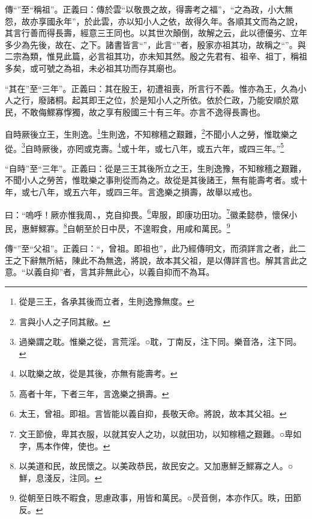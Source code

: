 {\noindent\zhuan{}\fzbyks 傳“”至“稱祖”。正義曰：傳於雲“以敬畏之故，得壽考之福”，“之為政，小大無怨，故亦享國永年”，於此雲，亦以知小人之依，故得久年。各順其文而為之說，其言行善而得長壽，經意三王同也。以其世次顛倒，故解之云，此以德優劣、立年多少為先後，故在、之下。諸書皆言“”，此言“”者，殷家亦祖其功，故稱之“”。與二宗為類，惟見此篇，必言祖其功，亦未知其然。殷之先君有、祖辛、祖丁，稱祖多矣，或可號之為祖，未必祖其功而存其廟也。 \par}

{\noindent\shu{}\fzkt “其在”至“三年”。正義曰：其在殷王，初遭祖喪，所言行不義。惟亦為王，久為小人之行，廢諸桐。起其即王之位，於是知小人之所依。依於仁政，乃能安順於眾民，不敢侮鰥寡惸獨，故之享有殷國三十有三年。亦言不逸得長壽也。 \par}

自時厥後立王，生則逸。\footnote{從是三王，各承其後而立者，生則逸豫無度。}生則逸，不知稼穡之艱難，\footnote{言與小人之子同其敝。}不聞小人之勞，惟耽樂之從。\footnote{過樂謂之耽。惟樂之從，言荒淫。○耽，丁南反，注下同。樂音洛，注下同。}自時厥後，亦罔或克壽。\footnote{以耽樂之故，從是其後，亦無有能壽考。}或十年，或七八年，或五六年，或四三年。”\footnote{高者十年，下者三年，言逸樂之損壽。}

{\noindent\shu{}\fzkt “自時”至“三年”。正義曰：從是三王其後所立之王，生則逸豫，不知稼穡之艱難，不聞小人之勞苦，惟耽樂之事則從而為之。故從是其後諸王，無有能壽考者。或十年，或七八年，或五六年，或四三年。言逸樂之損壽，故舉以戒也。 \par}

曰：“嗚呼！厥亦惟我周、，克自抑畏。\footnote{太王，曾祖。即祖。言皆能以義自抑，長敬天命。將說，故本其父祖。}卑服，即康功田功。\footnote{文王節儉，卑其衣服，以就其安人之功，以就田功，以知稼穡之艱難。○卑如字，馬本作俾，使也。}徽柔懿恭，懷保小民，惠鮮鰥寡。\footnote{以美道和民，故民懷之。以美政恭民，故民安之。又加惠鮮乏鰥寡之人。○鮮，息淺反，注同。}自朝至於日中昃，不遑暇食，用咸和萬民。\footnote{從朝至日昳不暇食，思慮政事，用皆和萬民。○昃音側，本亦作仄。昳，田節反。}


{\noindent\zhuan{}\fzbyks 傳“”至“父祖”。正義曰：“，曾祖。即祖也”，此乃經傳明文，而須詳言之者，此二王之下辭無所結，陳此不為無逸，將說，故本其父祖，是以傳詳言也。解其言此之意。“以義自抑”者，言其非無此心，以義自抑而不為耳。 \par}

